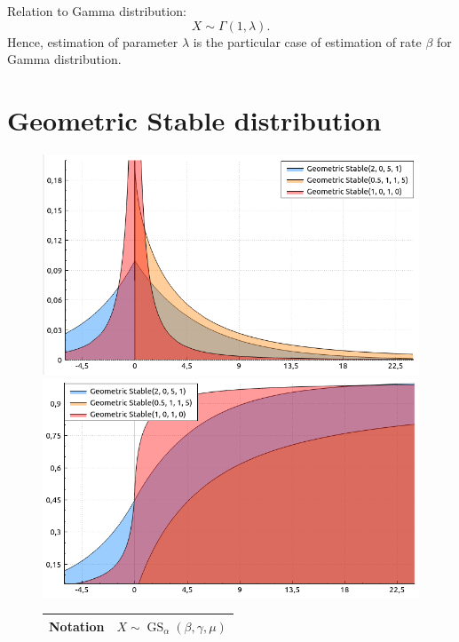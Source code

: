 \documentclass[a4paper,11pt]{article}
\theoremstyle{plain}
\theoremstyle{definition}
\begin{document}
	Relation to Gamma distribution:
	\[X \sim \Gamma(1, \lambda).\]
	Hence, estimation of parameter $\lambda$ is the particular case of estimation of rate $\beta$ for Gamma distribution.
	
	\pagebreak
	\section{Geometric Stable distribution}
	\begin{figure}[!htb]\centering
		\begin{minipage}{0.55\textwidth}
			\includegraphics[width=\linewidth, right]{geometric_stable_pdf}
			\captionsetup{labelformat=empty}
			\includegraphics[width=\linewidth, right]{geometric_stable_cdf}
			\captionsetup{labelformat=empty}
		\end{minipage}
		\begin{minipage}{0.4\textwidth}
			\begin{tabular}{| r | l |}
				\hline
				Notation & $X \sim \operatorname{GS}_\alpha(\beta, \gamma, \mu)$ \\
				\hline

\end{tabular}
\end{minipage}
\end{figure}
\end{document}
